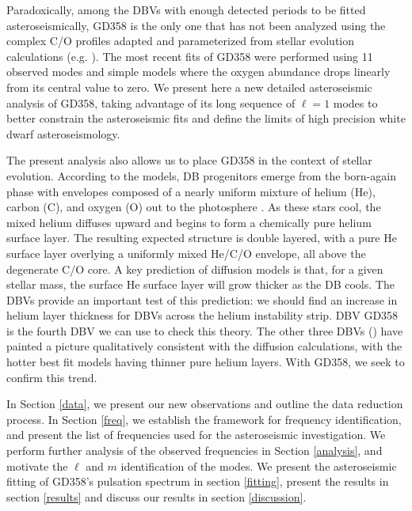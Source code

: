 \documentclass[12pt,preprint]{aastex}
\begin{document}
Paradoxically, among the DBVs with enough detected periods to be fitted 
asteroseismically, GD358 is the only one that has not been analyzed using the complex 
C/O profiles adapted and parameterized from stellar evolution calculations
(e.g. {}\citet{Salaris97,Althaus05}). The most recent fits of GD358 \citep{Metcalfe03c} were 
performed using 11 observed modes and simple models where the oxygen abundance 
drops linearly from its central value to zero. We present here a new detailed asteroseismic analysis 
of GD358, taking advantage of its long sequence of $\ell=1$ modes to better constrain 
the asteroseismic fits and define the limits of high precision white dwarf asteroseismology.  

The present analysis also allows us to place GD358 in the context of stellar evolution. 
According to the models, DB progenitors emerge from the born-again phase with 
envelopes composed of a nearly uniform mixture of helium (He), carbon (C), and oxygen (O) 
out to the photosphere \citep{Dreizler98,Herwig99}. As these stars cool, the mixed helium 
diffuses upward and begins to form a chemically pure helium surface layer. The resulting
expected structure is double layered, with a pure He surface layer overlying a uniformly 
mixed He/C/O envelope, all above the degenerate C/O core. A key prediction of diffusion models 
is that, for a given stellar mass, the surface He surface layer will grow thicker as the DB 
cools. The DBVs provide an important test of this prediction: we should find an increase in 
helium layer thickness for DBVs across the helium instability strip.  DBV GD358 is the fourth 
DBV we can use to check this theory. The other three DBVs 
(\citet{Bischoff-Kim14,Sullivan08, Metcalfe03c}) have painted a picture qualitatively consistent with 
the diffusion calculations, with the hotter best fit models having thinner pure helium 
layers. With GD358, we seek to confirm this trend.

In Section \ref{data}, we present our new observations and outline the data reduction process.  
In Section \ref{freq}, we establish the framework for frequency identification, and present the 
list of frequencies used for the asteroseismic investigation. We perform further analysis of the observed 
frequencies in Section \ref{analysis}, and motivate the $\ell$ and $m$ identification of the modes. 
We present the asteroseismic fitting of GD358's pulsation spectrum in section \ref{fitting}, present 
the results in section \ref{results} and discuss our results in section \ref{discussion}.
\end{document}
